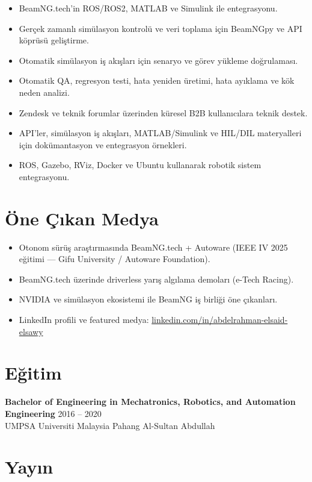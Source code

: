 \documentclass[11pt,a4paper]{article}
\begin{document}
\begin{itemize}
    \item BeamNG.tech'in ROS/ROS2, MATLAB ve Simulink ile entegrasyonu.
    \item Gerçek zamanlı simülasyon kontrolü ve veri toplama için BeamNGpy ve API köprüsü geliştirme.
    \item Otomatik simülasyon iş akışları için senaryo ve görev yükleme doğrulaması.
    \item Otomatik QA, regresyon testi, hata yeniden üretimi, hata ayıklama ve kök neden analizi.
    \item Zendesk ve teknik forumlar üzerinden küresel B2B kullanıcılara teknik destek.
    \item API'ler, simülasyon iş akışları, MATLAB/Simulink ve HIL/DIL materyalleri için dokümantasyon ve entegrasyon örnekleri.
    \item ROS, Gazebo, RViz, Docker ve Ubuntu kullanarak robotik sistem entegrasyonu.
\end{itemize}

\section*{Öne Çıkan Medya}

\begin{itemize}
    \item Otonom sürüş araştırmasında BeamNG.tech + Autoware (IEEE IV 2025 eğitimi — Gifu University / Autoware Foundation).
    \item BeamNG.tech üzerinde driverless yarış algılama demoları (e-Tech Racing).
    \item NVIDIA ve simülasyon ekosistemi ile BeamNG iş birliği öne çıkanları.
    \item LinkedIn profili ve featured medya: \href{https://www.linkedin.com/in/abdelrahman-elsaid-elsawy}{linkedin.com/in/abdelrahman-elsaid-elsawy}
\end{itemize}

\section*{Eğitim}

\textbf{\color{PrimaryColor}Bachelor of Engineering in Mechatronics, Robotics, and Automation Engineering}
\hfill 2016 -- 2020\\
UMPSA Universiti Malaysia Pahang Al-Sultan Abdullah

\section*{Yayın}
\end{document}
